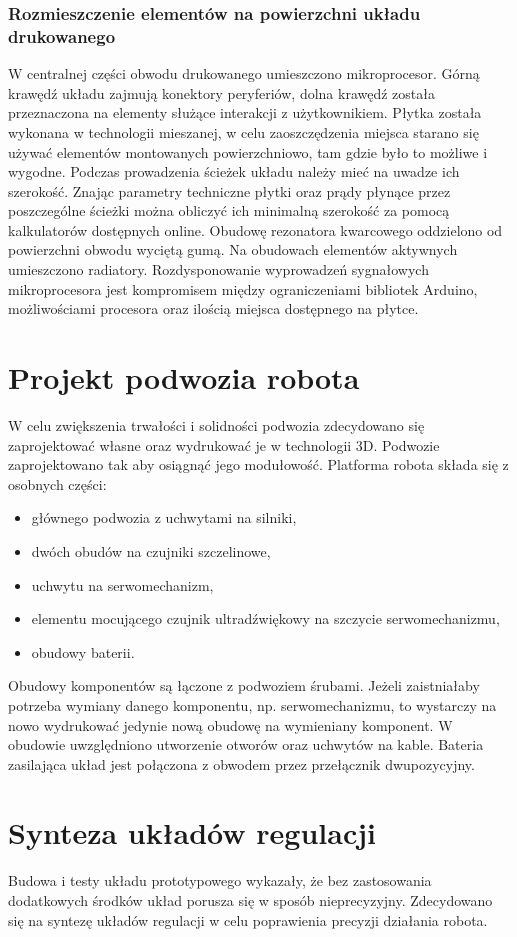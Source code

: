 \documentclass[11pt]{article}
\begin{document}
\subsubsection{Rozmieszczenie elementów na powierzchni układu drukowanego}
W centralnej części obwodu drukowanego umieszczono mikroprocesor.
Górną krawędź układu zajmują konektory peryferiów, dolna krawędź została przeznaczona na elementy służące interakcji z użytkownikiem.
Płytka została wykonana w technologii mieszanej, w celu zaoszczędzenia miejsca starano się używać elementów montowanych powierzchniowo, tam gdzie było to możliwe i wygodne.
Podczas prowadzenia ścieżek układu należy mieć na uwadze ich szerokość.
Znając parametry techniczne płytki oraz prądy płynące przez poszczególne ścieżki można obliczyć ich minimalną szerokość za pomocą kalkulatorów dostępnych online. %
Obudowę rezonatora kwarcowego oddzielono od powierzchni obwodu wyciętą gumą.
Na obudowach elementów aktywnych umieszczono radiatory.
Rozdysponowanie wyprowadzeń sygnałowych mikroprocesora jest kompromisem między ograniczeniami bibliotek Arduino, możliwościami procesora oraz ilością miejsca dostępnego na płytce.

\section{Projekt podwozia robota}
W celu zwiększenia trwałości i solidności podwozia zdecydowano się zaprojektować własne oraz wydrukować je w technologii 3D.
Podwozie zaprojektowano tak aby osiągnąć jego modułowość.
Platforma robota składa się z osobnych części:
\begin{itemize}
	\item głównego podwozia z uchwytami na silniki,
	\item dwóch obudów na czujniki szczelinowe,
	\item uchwytu na serwomechanizm,
	\item elementu mocującego czujnik ultradźwiękowy na szczycie serwomechanizmu,
	\item obudowy baterii.
\end{itemize}
Obudowy komponentów są łączone z podwoziem śrubami. Jeżeli zaistniałaby potrzeba wymiany danego komponentu, np. serwomechanizmu, to wystarczy na nowo wydrukować jedynie nową obudowę na wymieniany komponent.
W obudowie uwzględniono utworzenie otworów oraz uchwytów na kable.
Bateria zasilająca układ jest połączona z obwodem przez przełącznik dwupozycyjny.

\section{Synteza układów regulacji}
Budowa i testy układu prototypowego wykazały, że bez zastosowania dodatkowych środków układ porusza się w sposób nieprecyzyjny.
Zdecydowano się na syntezę układów regulacji w celu poprawienia precyzji działania robota.
\end{document}
